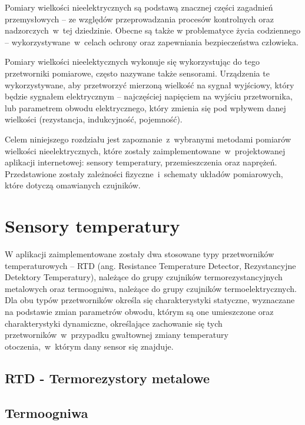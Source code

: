 Pomiary wielkości nieelektrycznych są podstawą znacznej części zagadnień przemysłowych -- ze
względów przeprowadzania procesów kontrolnych oraz nadzorczych~w~tej dziedzinie. Obecne są także w
problematyce życia codziennego -- wykorzystywane~w~celach ochrony oraz zapewniania bezpieczeństwa
człowieka.

Pomiary wielkości nieelektycznych wykonuje się wykorzystując do tego przetworniki pomiarowe, często
nazywane także sensorami. Urządzenia te wykorzystywane, aby przetworzyć mierzoną wielkość na sygnał
wyjściowy, który będzie sygnałem elektrycznym -- najczęściej napięciem na wyjściu przetwornika,
lub parametrem obwodu elektrycznego, który zmienia się pod wpływem danej wielkości (rezystancja,
indukcyjność, pojemność).

Celem niniejszego rozdziału jest zapoznanie~z~wybranymi metodami pomiarów wielkości
nieelektrycznych, które zostały zaimplementowane~w~projektowanej aplikacji internetowej: sensory
temperatury, przemieszczenia oraz naprężeń. Przedstawione zostały zależności fizyczne~i~schematy
układów pomiarowych, które dotyczą omawianych czujników.

\section{Sensory temperatury}
W aplikacji zaimplementowane zostały dwa stosowane typy przetworników temperaturowych -- RTD (ang.
Resistance Temperature Detector, Rezystancyjne Detektory Temperatury), należące do grupy czujników
termorezystancyjnych metalowych oraz termoogniwa, należące do grupy czujników termoelektrycznych.
Dla obu typów przetworników określa się charakterystyki statyczne, wyznaczane na podstawie zmian
parametrów obwodu, którym są one umieszczone oraz charakterystyki dynamiczne, określające zachowanie
się tych przetworników~w~przypadku gwałtownej zmiany temperatury otoczenia,~w~którym dany sensor się
znajduje.

\subsection{RTD - Termorezystory metalowe}


\subsection{Termoogniwa}


